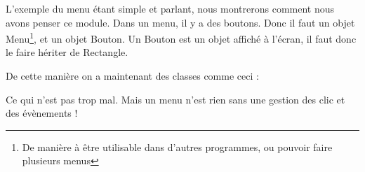 
L'exemple du menu étant simple et parlant, nous montrerons comment nous avons penser 
ce module. Dans un menu, il y a des boutons. Donc il faut un objet Menu\footnote{De manière à être 
utilisable dans d'autres programmes, ou pouvoir faire plusieurs menus}, et un objet Bouton. Un Bouton est un objet affiché à l'écran, il faut donc le faire hériter de Rectangle.

De cette manière on a maintenant des classes comme ceci : 
  
Ce qui n'est pas trop mal. Mais un menu n'est rien sans une gestion des clic et des évènements !
